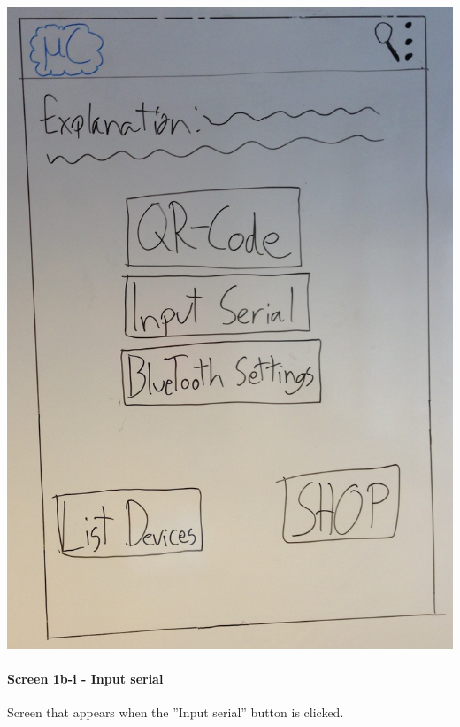 \begin{image}[H]
\includegraphics[scale=0.2]{images/Design_guide/Screen1b.png}
\end{image}


\paragraph{Screen 1b-i - Input serial}
Screen that appears when the ''Input serial'' button is clicked.

